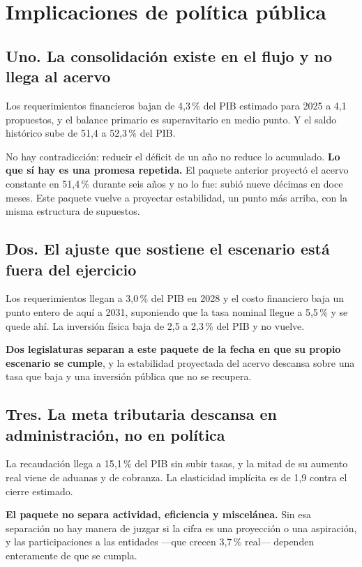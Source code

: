 \chapter*{Implicaciones de política pública}

\section*{Uno. La consolidación existe en el flujo y no llega al acervo}

Los requerimientos financieros bajan de 4,3\,\% del PIB estimado para 2025 a 4,1 propuestos, y
el balance primario es superavitario en medio punto. Y el saldo histórico sube de 51,4 a
52,3\,\% del PIB.

No hay contradicción: reducir el déficit de un año no reduce lo acumulado. \textbf{Lo que sí
hay es una promesa repetida.} El paquete anterior proyectó el acervo constante en 51,4\,\%
durante seis años y no lo fue: subió nueve décimas en doce meses. Este paquete vuelve a
proyectar estabilidad, un punto más arriba, con la misma estructura de supuestos.

\section*{Dos. El ajuste que sostiene el escenario está fuera del ejercicio}

Los requerimientos llegan a 3,0\,\% del PIB en 2028 y el costo financiero baja un punto entero
de aquí a 2031, suponiendo que la tasa nominal llegue a 5,5\,\% y se quede ahí. La inversión
física baja de 2,5 a 2,3\,\% del PIB y no vuelve.

\textbf{Dos legislaturas separan a este paquete de la fecha en que su propio escenario se
cumple}, y la estabilidad proyectada del acervo descansa sobre una tasa que baja y una
inversión pública que no se recupera.

\section*{Tres. La meta tributaria descansa en administración, no en política}

La recaudación llega a 15,1\,\% del PIB sin subir tasas, y la mitad de su aumento real viene de
aduanas y de cobranza. La elasticidad implícita es de 1,9 contra el cierre estimado.

\textbf{El paquete no separa actividad, eficiencia y miscelánea.} Sin esa separación no hay
manera de juzgar si la cifra es una proyección o una aspiración, y las participaciones a las
entidades ---que crecen 3,7\,\% real--- dependen enteramente de que se cumpla.

